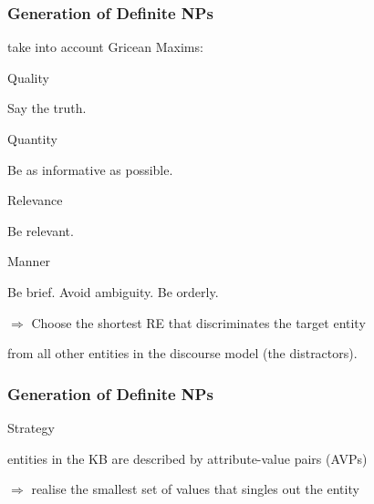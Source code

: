 \documentclass[compress,color=usenames]{beamer}
\begin{document}
\begin{frame}
\frametitle{
Generation of Deﬁnite NPs}



take into account Gricean Maxims:



Quality



Say the truth.



Quantity



Be as informative as possible.



Relevance



Be relevant.



Manner



Be brief. Avoid ambiguity. Be orderly.



$\Rightarrow$ Choose the shortest RE that discriminates the target entity



from all other entities in the discourse model (the distractors).










\end{frame}
\begin{frame}
\frametitle{
Generation of Deﬁnite NPs}



Strategy



entities in the KB are described by attribute-value pairs (AVPs)



$\Rightarrow$ realise the smallest set of values that singles out the entity










\end{frame}
\end{document}
